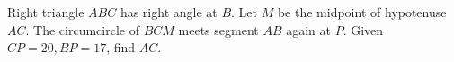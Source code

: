 Right triangle $ ABC $ has right angle at $ B $. Let $ M $ be the midpoint of hypotenuse $ AC $. The circumcircle of $ BCM $ meets segment $ AB $ again at $ P $. Given $ CP=20,BP=17 $, find $ AC $.
